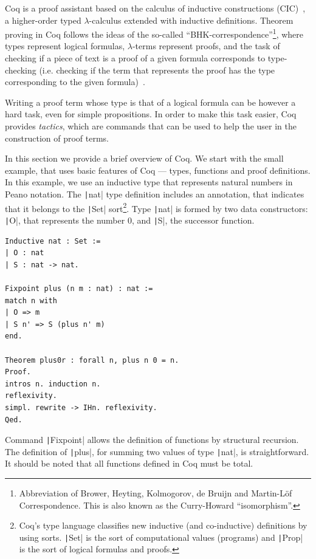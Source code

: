 \documentclass[oneside,12pt]{scrbook}
\theoremstyle{definition}
\newcommand{\coq}[1]{\texttt|#1|}
\theoremstyle{plain}
\theoremstyle{definition}
\begin{document}
Coq is a proof assistant based on the calculus of inductive
constructions (CIC)~\cite{Bertot2010}, a higher-order typed
$\lambda$-calculus extended with inductive definitions. Theorem
proving in Coq follows the ideas of the so-called
``BHK-correspondence''\footnote{Abbreviation of Brower, Heyting,
	Kolmogorov, de Bruijn and Martin-L\"of Correspondence. This is also
	known as the Curry-Howard ``isomorphism''.}, where types represent
logical formulas, $\lambda$-terms represent proofs, and the task of
checking if a piece of text is a proof of a given formula corresponds
to type-checking (i.e. checking if the term that represents the proof
has the type corresponding to the given formula)~\cite{Sorensen2006}.

Writing a proof term whose type is that of a logical formula can be
however a hard task, even for simple propositions.  In order to make
this task easier, Coq provides \emph{tactics}, which are commands that
can be used to help the user in the construction of proof terms.

In this section we provide a brief overview of Coq. We start with the
small example, that uses basic
features of Coq --- types, functions and proof definitions.  In this
example, we use an inductive type that represents natural numbers in
Peano notation. The \coq{nat} type definition includes an
annotation, that indicates that it belongs to the \coq{Set}
sort\footnote{Coq's type language classifies new inductive (and
	co-inductive) definitions by using sorts. \coq{Set} is the sort
	of computational values (programs) and \coq{Prop} is the sort of
	logical formulas and proofs.}. Type \coq{nat} is formed by two
data constructors: \coq{O}, that represents the number $0$, and \coq{S},
the successor function.
\begin{verbatim}
Inductive nat : Set :=
| O : nat
| S : nat -> nat.

Fixpoint plus (n m : nat) : nat :=
match n with
| O => m
| S n' => S (plus n' m)
end.

Theorem plus0r : forall n, plus n 0 = n.
Proof.
intros n. induction n.
reflexivity.
simpl. rewrite -> IHn. reflexivity.
Qed.
\end{verbatim}   

Command \coq{Fixpoint} allows the definition of functions by
structural recursion. The definition of \coq{plus}, for summing two
values of type \coq{nat}, is straightforward. It should be noted
that all functions defined in Coq must be total.
\end{document}
